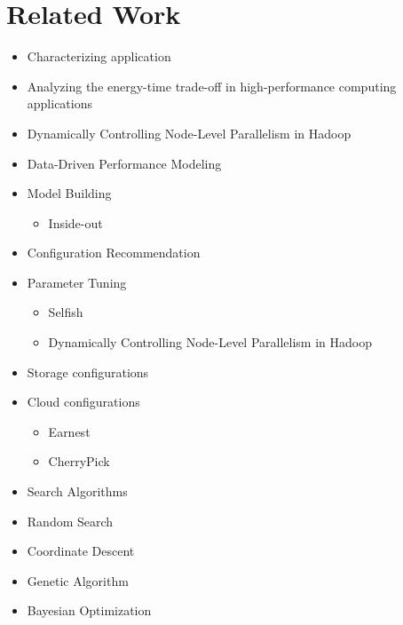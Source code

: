\section{Related Work}
\label{sec:related_work}

\begin{itemize}
\item
  Characterizing application
\item
  Analyzing the energy-time trade-off in high-performance computing
  applications
\item
  Dynamically Controlling Node-Level Parallelism in Hadoop
\item
  Data-Driven Performance Modeling
\item
  Model Building

  \begin{itemize}
  \item
    Inside-out
  \end{itemize}
\item
  Configuration Recommendation
\item
  Parameter Tuning

  \begin{itemize}
  \item
    Selfish
  \item
    Dynamically Controlling Node-Level Parallelism in Hadoop
  \end{itemize}
\item
  Storage configurations
\item
  Cloud configurations

  \begin{itemize}
  \item
    Earnest
  \item
    CherryPick
  \end{itemize}
\item
  Search Algorithms
\item
  Random Search
\item
  Coordinate Descent
\item
  Genetic Algorithm
\item
  Bayesian Optimization
\end{itemize}